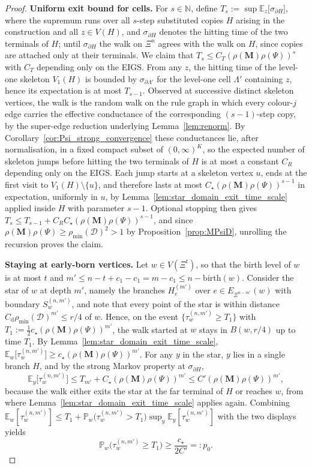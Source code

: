 \documentclass{article}
\theoremstyle{plain}
\theoremstyle{definition}
\newcommand{\dist}{\mathrm{d}}
\begin{document}
\begin{proof}
\textbf{Uniform exit bound for cells.}
For $s\in\mathbb N$, define $T_s:=\sup\mathbb E_z\bigl[\sigma_{\partial H}\bigr]$, where the supremum runs over all $s$-step substituted copies $H$ arising in the construction and all $z\in V(H)$, and $\sigma_{\partial H}$ denotes the hitting time of the two terminals of $H$; until $\sigma_{\partial H}$ the walk on $\Xi^n$ agrees with the walk on $H$, since copies are attached only at their terminals.
We claim that $T_s\le C_T(\rho(\mathbf M)\rho(\Psi))^{s}$ with $C_T$ depending only on the EIGS.
From any $z$, the hitting time of the level-one skeleton $V_1(H)$ is bounded by $\sigma_{\partial\Lambda'}$ for the level-one cell $\Lambda'$ containing $z$, hence its expectation is at most $T_{s-1}$.
Observed at successive distinct skeleton vertices, the walk is the random walk on the rule graph in which every colour-$j$ edge carries the effective conductance of the corresponding $(s-1)$-step copy, by the super-edge reduction underlying Lemma~\ref{lem:renorm}.
By Corollary~\ref{cor:Psi_strong_convergence} these conductances lie, after normalisation, in a fixed compact subset of $(0,\infty)^K$, so the expected number of skeleton jumps before hitting the two terminals of $H$ is at most a constant $C_R$ depending only on the EIGS.
Each jump starts at a skeleton vertex $u$, ends at the first visit to $V_1(H)\setminus\{u\}$, and therefore lasts at most $C_\star(\rho(\mathbf M)\rho(\Psi))^{s-1}$ in expectation, uniformly in $u$, by Lemma~\ref{lem:star_domain_exit_time_scale} applied inside $H$ with parameter $s-1$.
Optional stopping then gives $T_s\le T_{s-1}+C_RC_\star(\rho(\mathbf M)\rho(\Psi))^{s-1}$, and since $\rho(\mathbf M)\rho(\Psi)\ge\rho_{\min}(\mathcal D)^2>1$ by Proposition~\ref{prop:MPsiD}, unrolling the recursion proves the claim.

\textbf{Staying at early-born vertices.}
Let $w\in V(\Xi^{t})$, so that the birth level of $w$ is at most $t$ and $m'\le n-t+c_1-c_1= m-c_1\le n-\mathrm{birth}(w)$.
Consider the star of $w$ at depth $m'$, namely the branches $H_e^{(m')}$ over $e\in E_{\Xi^{n-m'}}(w)$ with boundary $S_w^{(n,m')}$, and note that every point of the star is within distance $C_{\dist}\rho_{\min}(\mathcal D)^{m'}\le r/4$ of $w$.
Hence, on the event $\{\tau_w^{(n,m')}\ge T_1\}$ with $T_1:=\tfrac12 c_\star(\rho(\mathbf M)\rho(\Psi))^{m'}$, the walk started at $w$ stays in $B(w,r/4)$ up to time $T_1$.
By Lemma~\ref{lem:star_domain_exit_time_scale}, $\mathbb E_w\bigl[\tau_w^{(n,m')}\bigr]\ge c_\star(\rho(\mathbf M)\rho(\Psi))^{m'}$.
For any $y$ in the star, $y$ lies in a single branch $H$, and by the strong Markov property at $\sigma_{\partial H}$,
\[
\mathbb E_y\bigl[\tau_w^{(n,m')}\bigr]
\le
T_{m'}+C_\star(\rho(\mathbf M)\rho(\Psi))^{m'}
\le
C'(\rho(\mathbf M)\rho(\Psi))^{m'},
\]
because the walk either exits the star at the far terminal of $H$ or reaches $w$, from where Lemma~\ref{lem:star_domain_exit_time_scale} applies again.
Combining $\mathbb E_w[\tau_w^{(n,m')}]\le T_1+\mathbb P_w\bigl(\tau_w^{(n,m')}>T_1\bigr)\sup_y\mathbb E_y[\tau_w^{(n,m')}]$ with the two displays yields
\[
\mathbb P_w\bigl(\tau_w^{(n,m')}\ge T_1\bigr)\ge\frac{c_\star}{2C'}=:p_0.
\]


\end{proof}
\end{document}

